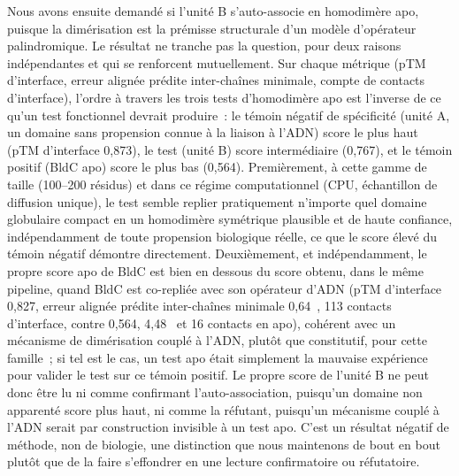 \documentclass[11pt,a4paper]{article}
\newcommand{\ang}{\text{\AA}}
\begin{document}
Nous avons ensuite demandé si l'unité B s'auto-associe en homodimère apo, puisque la dimérisation
est la prémisse structurale d'un modèle d'opérateur palindromique. Le résultat ne tranche pas la
question, pour deux raisons indépendantes et qui se renforcent mutuellement. Sur chaque métrique
(pTM d'interface, erreur alignée prédite inter-chaînes minimale, compte de contacts d'interface),
l'ordre à travers les trois tests d'homodimère apo est l'inverse de ce qu'un test fonctionnel
devrait produire~: le témoin négatif de spécificité (unité A, un domaine sans propension connue à
la liaison à l'ADN) score le plus haut (pTM d'interface 0,873), le test (unité B) score
intermédiaire (0,767), et le témoin positif (BldC apo) score le plus bas (0,564). Premièrement, à
cette gamme de taille (100--200 résidus) et dans ce régime computationnel (CPU, échantillon de
diffusion unique), le test semble replier pratiquement n'importe quel domaine globulaire compact en
un homodimère symétrique plausible et de haute confiance, indépendamment de toute propension
biologique réelle, ce que le score élevé du témoin négatif démontre directement. Deuxièmement, et
indépendamment, le propre score apo de BldC est bien en dessous du score obtenu, dans le même
pipeline, quand BldC est co-repliée avec son opérateur d'ADN (pTM d'interface 0,827, erreur alignée
prédite inter-chaînes minimale 0,64~\ang{}, 113 contacts d'interface, contre 0,564, 4,48~\ang{} et
16 contacts en apo), cohérent avec un mécanisme de dimérisation couplé à l'ADN, plutôt que
constitutif, pour cette famille~; si tel est le cas, un test apo était simplement la mauvaise
expérience pour valider le test sur ce témoin positif. Le propre score de l'unité B ne peut donc
être lu ni comme confirmant l'auto-association, puisqu'un domaine non apparenté score plus haut, ni
comme la réfutant, puisqu'un mécanisme couplé à l'ADN serait par construction invisible à un test
apo. C'est un résultat négatif de méthode, non de biologie, une distinction que nous maintenons de
bout en bout plutôt que de la faire s'effondrer en une lecture confirmatoire ou réfutatoire.
\end{document}
